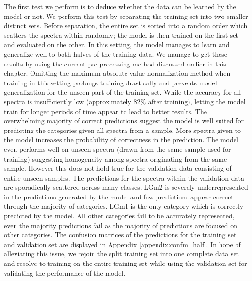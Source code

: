 The first test we perform is to deduce whether the data can be learned by the model or not. We perform this test by separating the training set into two smaller distinct sets. Before separation, the entire set is sorted into a random order which scatters the spectra within randomly; the model is then trained on the first set and evaluated on the other. In this setting, the model manages to learn and generalize well to both halves of the training data. We manage to get these results by using the current pre-processing method discussed earlier in this chapter. Omitting the maximum absolute value normalization method when training in this setting prolongs training drastically and prevents model generalization for the unseen part of the training set. While the accuracy for all spectra is insufficiently low (approximately $82\%$ after training), letting the model train for longer periods of time appear to lead to better results. The overwhelming majority of correct predictions suggest the model is well suited for predicting the categories given all spectra from a sample. More spectra given to the model increases the probability of correctness in the prediction. The model even performs well on unseen spectra (drawn from the same sample used for training) suggesting homogeneity among spectra originating from the same sample. However this does not hold true for the validation data consisting of entire unseen samples. The predictions for the spectra within the validation data are sporadically scattered across many classes. LGm2 is severely underrepresented in the predictions generated by the model and few predictions appear correct through the majority of categories. LGm1 is the only category which is correctly predicted by the model. All other categories fail to be accurately represented, even the majority predictions fail as the majority of predictions are focused on other categories. The confusion matrices of the predictions for the training set and validation set are displayed in Appendix \ref{appendix:confm_half}. In hope of alleviating this issue, we rejoin the split training set into one complete data set and resolve to training on the entire training set while using the validation set for validating the performance of the model.

